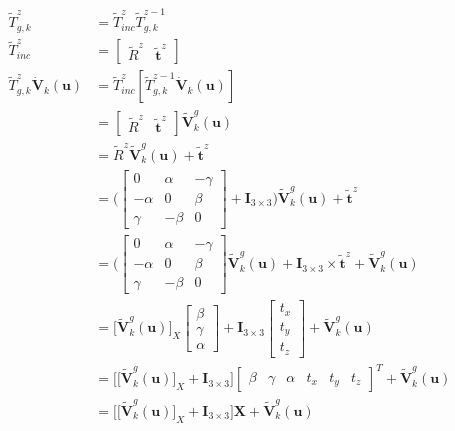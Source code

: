 \documentclass[fleqn]{article}
\begin{document}
\subsection{}
\begin{adjustwidth}{4em}{0pt}
	\begin{align}
		\tilde{T}^z_{g,k} &= \tilde{T}^z_{inc} \tilde{T}^{z-1}_{g,k} \\
		\tilde{T}^z_{inc} &= \begin{bmatrix} \tilde{R}^z & \tilde{\boldsymbol{t}}^z\end{bmatrix} \\
		\tilde{T}^z_{g,k} \dot{\boldsymbol{V}}_k(\boldsymbol{u}) &= \tilde{T}^z_{inc} [\tilde{T}^{z-1}_{g,k} \dot{\boldsymbol{V}}_k(\boldsymbol{u})]\\
		& = \begin{bmatrix} \tilde{R}^z & \tilde{\boldsymbol{t}}^z\end{bmatrix} \tilde{\boldsymbol{V}}^g_k(\boldsymbol{u}) \\
		& =  \tilde{R}^z \tilde{\boldsymbol{V}}^g_k(\boldsymbol{u}) + \tilde{\boldsymbol{t}}^z \\
		& = \bigg(\begin{bmatrix} 0 & \alpha & -\gamma \\ -\alpha & 0 & \beta\\ \gamma & -\beta & 0\end{bmatrix} +\boldsymbol{I}_{3 \times 3}\bigg)\tilde{\boldsymbol{V}}^g_k(\boldsymbol{u}) + \tilde{\boldsymbol{t}}^z \\
		& = \bigg(\begin{bmatrix} 0 & \alpha & -\gamma \\ -\alpha & 0 & \beta\\ \gamma & -\beta & 0\end{bmatrix}\tilde{\boldsymbol{V}}^g_k(\boldsymbol{u}) + \boldsymbol{I}_{3 \times 3} \times \tilde{\boldsymbol{t}}^z+ \tilde{\boldsymbol{V}}^g_k(\boldsymbol{u}) \\
		& = \big[\tilde{\boldsymbol{V}}^g_k(\boldsymbol{u})\big]_X \begin{bmatrix} \beta \\ \gamma \\ \alpha \end{bmatrix} + \boldsymbol{I}_{3 \times 3} \begin{bmatrix} t_x \\ t_y \\ t_z \end{bmatrix}+ \tilde{\boldsymbol{V}}^g_k(\boldsymbol{u}) \\
		& = \bigg[\big[\tilde{\boldsymbol{V}}^g_k(\boldsymbol{u})\big]_X + \boldsymbol{I}_{3 \times 3}\bigg] \begin{bmatrix} \beta & \gamma & \alpha & t_x & t_y & t_z \end{bmatrix}^T + \tilde{\boldsymbol{V}}^g_k(\boldsymbol{u}) \\
		& = \bigg[\big[\tilde{\boldsymbol{V}}^g_k(\boldsymbol{u})\big]_X + \boldsymbol{I}_{3 \times 3}\bigg] \boldsymbol{X} + \tilde{\boldsymbol{V}}^g_k(\boldsymbol{u}) \\
	\end{align}	
\end{adjustwidth}
\end{document}
